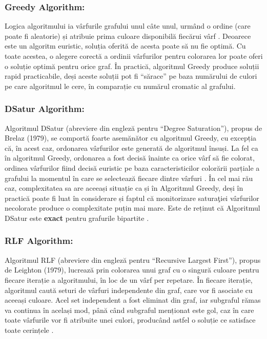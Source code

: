 \documentclass[runningheads]{llncs}
\begin{document}
\subsubsection{Greedy Algorithm:}
Logica algoritmului ia vârfurile grafului unul câte unul, urmând o ordine 
(care poate fi aleatorie) și atribuie prima culoare disponibilă fiecărui vârf \cite{12}. 
Deoarece este un algoritm euristic, soluția oferită de acesta poate să nu fie optimă.
Cu toate acestea, o alegere corectă a ordinii vârfurilor pentru
colorarea lor poate oferi o soluție optimă pentru orice graf. În
practică, algoritmul Greedy produce soluții rapid practicabile, deși aceste soluții 
pot fi “sărace” pe baza numărului de culori pe care algoritmul le cere, în comparație cu
numărul cromatic al grafului.

\subsubsection{DSatur Algorithm:}
Algoritmul DSatur (abreviere din engleză pentru “Degree Saturation”), 
propus de Brelaz (1979), se comportă foarte asemănător cu
algoritmul Greedy, cu excepția că, în acest caz,
ordonarea vârfurilor este generată de algoritmul însuși.
La fel ca în algoritmul Greedy, ordonarea a fost decisă
înainte ca orice vârf să fie colorat, ordinea vârfurilor fiind decisă euristic pe baza
caracteristicilor colorării parțiale a grafului la
momentul în care se selectează fiecare dintre vârfuri \cite{13}. 
În cel mai rău caz, complexitatea sa are aceeași situație ca și în
Algoritmul Greedy, deși în practică poate fi luat în considerare
și faptul că monitorizare saturaţiei vârfurilor necolorate
produce o complexitate puțin mai mare. Este de reținut că
Algoritmul DSatur este \textbf{exact} pentru grafurile bipartite \cite{14}.

\subsubsection{RLF Algorithm:}
Algoritmul RLF (abreviere din engleză pentru “Recursive Largest First”), propus
de Leighton (1979), lucrează prin colorarea unui graf cu o singură culoare
pentru fiecare iterație a algoritmului, în loc de un vârf per
repetare. În fiecare iterație, algoritmul caută seturi de
vârfuri independente din graf, care vor fi asociate
cu aceeași culoare. Acel set independent a fost eliminat
din graf, iar subgraful rămas va continua
în același mod, până când subgraful menționat este gol, caz în care
toate vârfurile vor fi atribuite unei culori, producând astfel o
soluție ce satisface toate cerințele \cite{12}.
\end{document}
